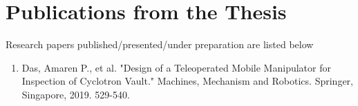 \chapter*{Publications from the Thesis}
Research papers published/presented/under preparation are listed below
\begin{enumerate}
\item  Das, Amaren P., et al. "Design of a Teleoperated Mobile Manipulator for Inspection of Cyclotron Vault." Machines, Mechanism and Robotics. Springer, Singapore, 2019. 529-540.
\end{enumerate}
